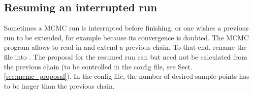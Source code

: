 \documentclass[11pt, chapterprefix, headsepline]{scrartcl}
\begin{document}
\begin{appendix}
\subsection{Resuming an interrupted run}

Sometimes a MCMC run is interrupted before finishing, or one wishes a
previous run to be extended, for example because its convergence is
doubted. The MCMC program allows to read in and extend a previous
chain. To that end, rename the file  into
. The proposal for the resumed run can but need not
be calculated from the previous chain (to be controlled in the config
file, see Sect.\ref{sec:mcmc_proposal}). In the config file, the
number of desired sample points has to be larger than the previous
chain.

\end{appendix}




\end{document}
